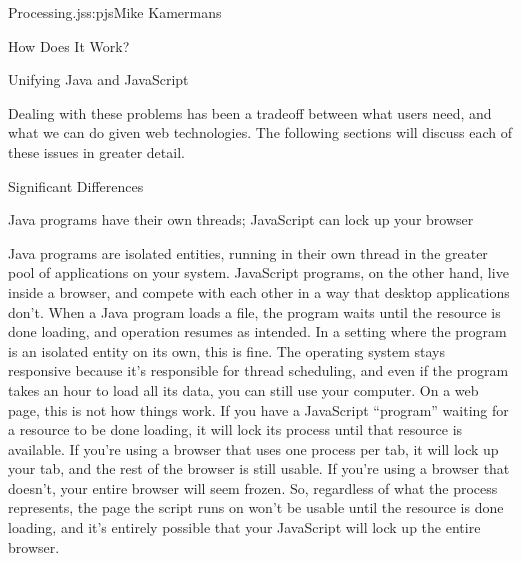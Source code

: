 \begin{aosachapter}{Processing.js}{s:pjs}{Mike Kamermans}
\begin{aosasect1}{How Does It Work?}
\begin{aosasect2}{Unifying Java and JavaScript}
\begin{aosaenumerate}
\end{aosaenumerate}

Dealing with these problems has been a tradeoff between what users
need, and what we can do given web technologies. The following
sections will discuss each of these issues in greater detail.

\end{aosasect2}

\end{aosasect1}

\begin{aosasect1}{Significant Differences}

\begin{aosasect3}{Java programs have their own threads; JavaScript can lock up your browser}

Java programs are isolated entities, running in their own thread in
the greater pool of applications on your system. JavaScript programs,
on the other hand, live inside a browser, and compete with each other
in a way that desktop applications don't. When a Java program loads a
file, the program waits until the resource is done loading, and
operation resumes as intended. In a setting where the program is an
isolated entity on its own, this is fine. The operating system stays
responsive because it's responsible for thread scheduling, and even if
the program takes an hour to load all its data, you can still use your
computer. On a web page, this is not how things work. If you have a
JavaScript ``program'' waiting for a resource to be done loading, it
will lock its process until that resource is available. If you're
using a browser that uses one process per tab, it will lock up your tab,
and the rest of the browser is still usable. If you're using a browser
that doesn't, your entire browser will seem frozen. So, regardless of
what the process represents, the page the script runs on won't be
usable until the resource is done loading, and it's entirely possible
that your JavaScript will lock up the entire browser.


\end{aosasect3}
\end{aosasect1}
\end{aosachapter}
